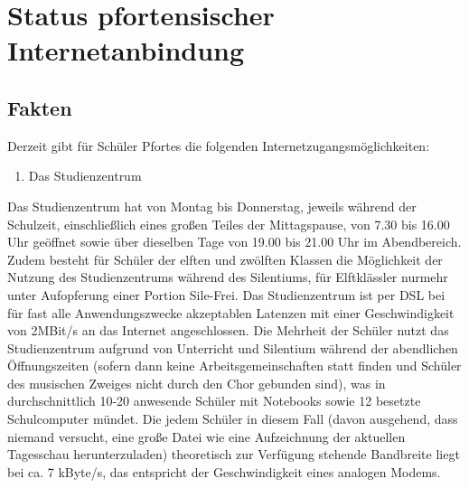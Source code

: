 \documentclass[10pt,a4paper,notitlepage]{scrartcl}
\newcommand{\gfu}{\glqq}
\begin{document}
\section{Status pfortensischer Internetanbindung}
\subsection{Fakten}
\begin{multicols}{2}
Derzeit gibt für Schüler Pfortes die folgenden Internetzugangsmöglichkeiten:
\begin{enumerate}
  \item Das Studienzentrum
\end{enumerate}
Das Studienzentrum hat von Montag bis Donnerstag, jeweils während der Schulzeit, einschließlich eines großen Teiles der Mittagspause, von 7.30 bis 16.00 Uhr geöffnet sowie über dieselben Tage von 19.00 bis 21.00 Uhr im Abendbereich. Zudem besteht für Schüler der elften und zwölften Klassen die Möglichkeit der Nutzung des Studienzentrums während des Silentiums, für Elftklässler nurmehr unter Aufopferung einer Portion \gfu Sile-Frei\grqq. Das Studienzentrum ist per DSL bei für fast alle Anwendungszwecke akzeptablen Latenzen mit einer Geschwindigkeit von 2MBit/s an das Internet angeschlossen. Die Mehrheit der Schüler nutzt das Studienzentrum aufgrund von Unterricht und Silentium während der abendlichen Öffnungszeiten (sofern dann keine Arbeitsgemeinschaften statt finden und Schüler des musischen Zweiges nicht durch den Chor gebunden sind), was in durchschnittlich 10-20 anwesende Schüler mit Notebooks sowie 12 besetzte Schulcomputer mündet. Die jedem Schüler in diesem Fall (davon ausgehend, dass niemand versucht, eine große Datei wie eine Aufzeichnung der aktuellen Tagesschau herunterzuladen) theoretisch zur Verfügung stehende Bandbreite liegt bei ca. 7 kByte/s, das entspricht der Geschwindigkeit eines analogen Modems.
\end{multicols}
%
\end{document}
